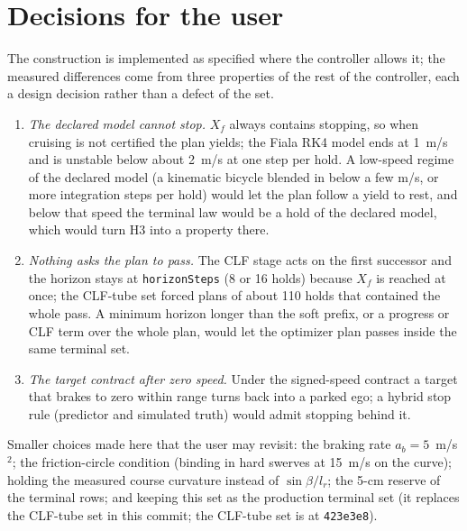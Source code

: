 \documentclass[11pt]{article}
\begin{document}
\section{Decisions for the user}
\label{sec:decisions}
The construction is implemented as specified where the controller allows
it; the measured differences come from three properties of the rest of the
controller, each a design decision rather than a defect of the set.
\begin{enumerate}
\item \emph{The declared model cannot stop.} $X_f$ always contains
stopping, so when cruising is not certified the plan yields; the Fiala
RK4 model ends at 1~m/s and is unstable below about 2~m/s at one step per
hold. A low-speed regime of the declared model (a kinematic bicycle blended
in below a few m/s, or more integration steps per hold) would let the plan
follow a yield to rest, and below that speed the terminal law would be a
hold of the declared model, which would turn H3 into a property there.
\item \emph{Nothing asks the plan to pass.} The CLF stage acts on the first
successor and the horizon stays at \texttt{horizonSteps} (8 or 16 holds)
because $X_f$ is reached at once; the CLF-tube set forced plans of about 110
holds that contained the whole pass. A minimum horizon longer than the soft
prefix, or a progress or CLF term over the whole plan, would let the
optimizer plan passes inside the same terminal set.
\item \emph{The target contract after zero speed.} Under the signed-speed
contract a target that brakes to zero within range turns back into a
parked ego; a hybrid stop rule (predictor and simulated truth) would admit
stopping behind it.
\end{enumerate}
Smaller choices made here that the user may revisit: the braking rate
$a_b=5$~m/s$^2$; the friction-circle condition (binding in hard swerves at
15~m/s on the curve); holding the measured course curvature instead of
$\sin\beta/l_r$; the 5-cm reserve of the terminal rows; and keeping this set
as the production terminal set (it replaces the CLF-tube set in this commit;
the CLF-tube set is at \texttt{423e3e8}).
\end{document}
